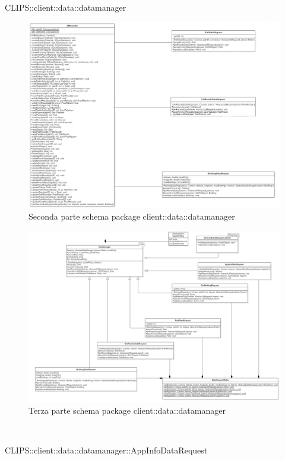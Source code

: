 \begin{componente}{CLIPS::client::data::datamanager}
\begin{figure}[h!]
 	\includegraphics[scale=0.4]{img/package/png/client--datamanager2.png}
 	\caption{Seconda parte schema package client::data::datamanager}
 \end{figure}
 \begin{figure}[h!]
 	\centering
 	\includegraphics[scale=0.35]{img/package/png/client--datamanager3.png}
 	\caption{Terza parte schema package client::data::datamanager}
 \end{figure}
\begin{compClassi} \\
\begin{classe}{CLIPS::client::data::datamanager::AppInfoDataRequest}

\end{classe}
\end{compClassi}
\end{componente}
